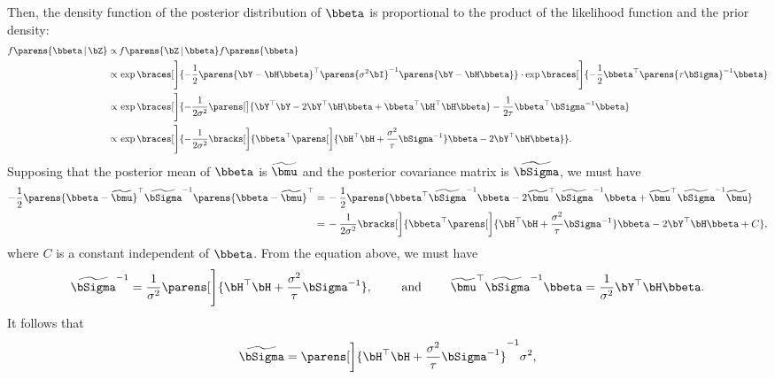 \documentclass[12pt]{article}
\begin{document}
\begin{enumerate}[label=\textbf{\arabic*.}]
	Then, the density function of the posterior distribution of $\bbeta$ is proportional to the product of the likelihood function and the prior density: 
	\begin{align*}
		f \parens{\bbeta \,\vert\, \bZ} \propto & \, f \parens{\bZ \,\vert\, \bbeta} f \parens{\bbeta} \\ 
		\propto & \, \exp \braces[\Bigg]{- \frac{1}{2} \parens{\bY - \bH \bbeta}^\top \parens{\sigma^2 \bI}^{-1} \parens{\bY - \bH \bbeta}} \cdot \exp \braces[\Bigg]{-\frac{1}{2} {\bbeta}^\top \parens{\tau \bSigma}^{-1} {\bbeta}} \\ 
		\propto & \, \exp \braces[\Bigg]{- \frac{1}{2 \sigma^2} \parens[\big]{\bY^\top \bY - 2 \bY^\top \bH \bbeta + \bbeta^\top \bH^\top \bH \bbeta} - \frac{1}{2 \tau} {\bbeta}^\top \bSigma^{-1} {\bbeta}} \\
		\propto & \, \exp \braces[\Bigg]{- \frac{1}{2 \sigma^2} \bracks[\bigg]{\bbeta^\top \parens[\bigg]{\bH^\top \bH +\frac{\sigma^2}{\tau}\bSigma^{-1}} \bbeta - 2 \bY^\top \bH \bbeta}}. 
	\end{align*}
	Supposing that the posterior mean of $\bbeta$ is $\widetilde{\bmu}$ and the posterior covariance matrix is $\widetilde{\bSigma}$, we must have 
	\begin{align*}
		- \frac{1}{2} \parens{\bbeta - \widetilde{\bmu}}^\top \widetilde{\bSigma}^{-1} \parens{\bbeta - \widetilde{\bmu}}^\top 
		= & \, - \frac{1}{2} \parens{\bbeta^\top \widetilde{\bSigma}^{-1} \bbeta - 2 \widetilde{\bmu}^\top \widetilde{\bSigma}^{-1} \bbeta + \widetilde{\bmu}^\top \widetilde{\bSigma}^{-1} \widetilde{\bmu}} \\ 
		= & \, - \frac{1}{2\sigma^2} \bracks[\bigg]{\bbeta^\top \parens[\bigg]{\bH^\top \bH +\frac{\sigma^2}{\tau}\bSigma^{-1}} \bbeta - 2 \bY^\top \bH \bbeta + C}, 
	\end{align*}
	where $C$ is a constant independent of $\bbeta$. From the equation above, we must have 
	\begin{align}
		\widetilde{\bSigma}^{-1} = \frac{1}{\sigma^2} \parens[\Bigg]{\bH^\top \bH +\frac{\sigma^2}{\tau}\bSigma^{-1}}, \hspace{20pt} \text{ and } \hspace{20pt} \widetilde{\bmu}^\top \widetilde{\bSigma}^{-1} \bbeta = \frac{1}{\sigma^2} \bY^\top \bH \bbeta. 
	\end{align}
	It follows that 
	\begin{align}
		\widetilde{\bSigma} = \parens[\bigg]{\bH^\top \bH +\frac{\sigma^2}{\tau}\bSigma^{-1}}^{-1} \sigma^2, 
	\end{align}

\end{enumerate}
\end{document}
